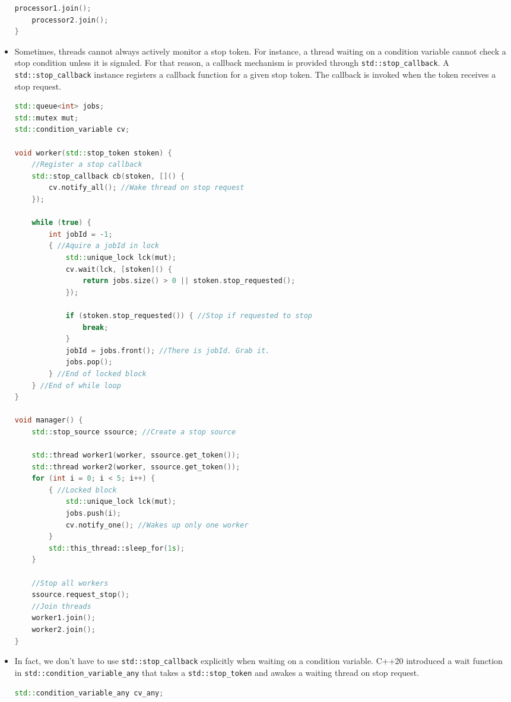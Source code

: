 \documentclass[a4paper,11pt,twoside]{book}
\begin{document}
\begin{itemize}
\begin{lstlisting}[frame=single, language=c++]
	processor1.join();
	processor2.join();
}
\end{lstlisting}

\item Sometimes, threads cannot always actively monitor a stop token. For instance, a thread waiting on a condition variable cannot check a stop condition unless it is signaled. For that reason, a callback mechanism is provided through \texttt{std::stop\_callback}. A \texttt{std::stop\_callback} instance registers a callback function for a given stop token. The callback is invoked when the token receives a stop request.

\begin{lstlisting}[frame=single, language=c++]
std::queue<int> jobs;
std::mutex mut;
std::condition_variable cv;

void worker(std::stop_token stoken) {
	//Register a stop callback  
	std::stop_callback cb(stoken, []() {
		cv.notify_all(); //Wake thread on stop request
	});
	
	while (true) {
		int jobId = -1;
		{ //Aquire a jobId in lock
			std::unique_lock lck(mut);
			cv.wait(lck, [stoken]() {
				return jobs.size() > 0 || stoken.stop_requested();
			});
			
			if (stoken.stop_requested()) { //Stop if requested to stop
				break;
			}
			jobId = jobs.front(); //There is jobId. Grab it.
			jobs.pop();
		} //End of locked block
	} //End of while loop
}

void manager() {
	std::stop_source ssource; //Create a stop source
	
	std::thread worker1(worker, ssource.get_token());
	std::thread worker2(worker, ssource.get_token());
	for (int i = 0; i < 5; i++) {
		{ //Locked block
			std::unique_lock lck(mut);
			jobs.push(i);
			cv.notify_one(); //Wakes up only one worker
		}
		std::this_thread::sleep_for(1s);
	}
	
	//Stop all workers
	ssource.request_stop();
	//Join threads
	worker1.join();
	worker2.join();
}	
\end{lstlisting}


\item In fact, we don't have to use \texttt{std::stop\_callback} explicitly when waiting on a condition variable. C++20 introduced a wait function in \texttt{std::condition\_variable\_any} that takes a \texttt{std::stop\_token} and awakes a waiting thread on stop request. 
\begin{lstlisting}[frame=single, language=c++]	
std::condition_variable_any cv_any;


\end{lstlisting}
\end{itemize}
\end{document}
